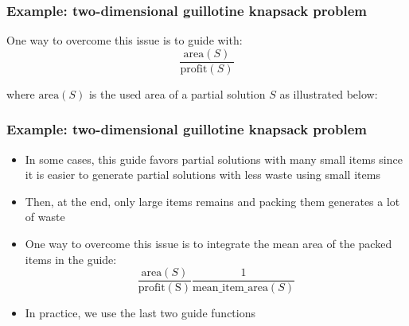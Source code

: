 \documentclass[10pt]{beamer}
\begin{document}
\begin{frame}
  \frametitle{Example: two-dimensional guillotine knapsack problem}

  One way to overcome this issue is to guide with:
  \begin{displaymath}
    \frac{\mathrm{area}(S)}{\mathrm{profit}(S)}
  \end{displaymath}

  where $\mathrm{area}(S)$ is the used area of a partial solution $S$ as illustrated below:

  \begin{center}
  \end{center}

\end{frame}

\begin{frame}
  \frametitle{Example: two-dimensional guillotine knapsack problem}

  \begin{itemize}
    \item In some cases, this guide favors partial solutions with many small items since it is easier to generate partial solutions with less waste using small items
    \item Then, at the end, only large items remains and packing them generates a lot of waste
    \item One way to overcome this issue is to integrate the mean area of the packed items in the guide:
      \begin{displaymath}
         \frac{\mathrm{area}(S)}{\mathrm{profit(S)}} \frac{1}{\mathrm{mean\_item\_area}(S)}
      \end{displaymath}
    \item In practice, we use the last two guide functions
  \end{itemize}
\end{frame}
\end{document}
